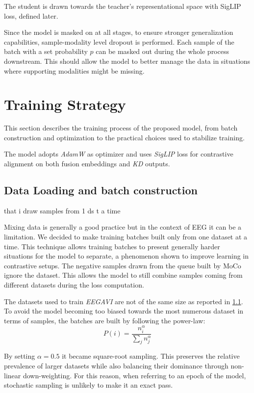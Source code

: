 The student is drawn towards the teacher's representational space with SigLIP loss, defined later.

Since the model is masked on at all stages, to ensure stronger generalization capabilities, sample-modality level dropout is performed.
Each sample of the batch with a set probability $p$ can be masked out during the whole process downstream.
This should allow the model to better manage the data in situations where supporting modalities might be missing.


\section{Training Strategy}
This section describes the training process of the proposed model, from batch construction and optimization to the practical choices used to stabilize training.

The model adopts \textit{AdamW} as optimizer and uses \textit{SigLIP} loss for contrastive alignment on both fusion embeddings and \textit{KD} outputs.

\subsection{Data Loading and batch construction}

that i draw samples from 1 ds t a time

Mixing data is generally a good practice but in the context of EEG it can be a limitation.
We decided to make training batches built only from one dataset at a time.
This technique allows training batches to present generally harder situations for the model to separate, a phenomenon shown to improve learning in contrastive setups.
The negative samples drawn from the queue built by MoCo ignore the dataset.
This allows the model to still combine samples coming from different datasets during the loss computation.

The datasets used to train \textit{EEGAVI} are not of the same size as reported in \ref{}.
To avoid the model becoming too biased towards the most numerous dataset in terms of samples, the batches are built by following the power-law:
$$P(i) = \frac{n_i^\alpha}{\sum_{j}{n_j^\alpha}}$$

By setting $\alpha=0.5$ it became square-root sampling.
This preserves the relative prevalence of larger datasets while also balancing their dominance through non-linear down-weighting.
For this reason, when referring to an epoch of the model, stochastic sampling is unlikely to make it an exact pass.




